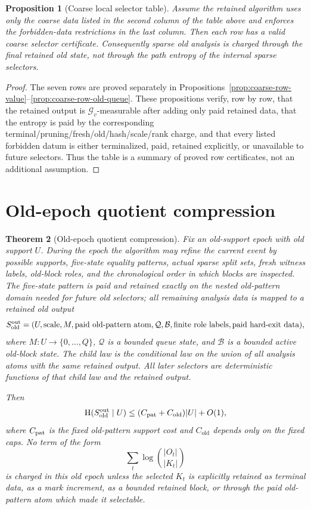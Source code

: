 \documentclass[11pt]{article}
\newtheorem{theorem}{Theorem}[section]
\newtheorem{proposition}[theorem]{Proposition}
\theoremstyle{remark}
\newcommand{\G}{\mathcal G}
\newcommand{\HH}{\mathrm H}
\newcommand{\old}{\mathrm{old}}
\begin{document}
\begin{proposition}[Coarse local selector table]\label{prop:coarse-table}
Assume the retained algorithm uses only the coarse data listed in the second column of the table above and enforces the forbidden-data restrictions in the last column.  Then each row has a valid coarse selector certificate.  Consequently sparse old analysis is charged through the final retained old state, not through the path entropy of the internal sparse selectors.
\end{proposition}

\begin{proof}
The seven rows are proved separately in Propositions~\ref{prop:coarse-row-value}--\ref{prop:coarse-row-old-queue}.  These propositions verify, row by row, that the retained output is $\G_v$-measurable after adding only paid retained data, that the entropy is paid by the corresponding terminal/pruning/fresh/old/hash/scale/rank charge, and that every listed forbidden datum is either terminalized, paid, retained explicitly, or unavailable to future selectors.  Thus the table is a summary of proved row certificates, not an additional assumption.
\end{proof}

\section{Old-epoch quotient compression}

\begin{theorem}[Old-epoch quotient compression]\label{thm:old-epoch-quotient-compression}
Fix an old-support epoch with old support $U$.  During the epoch the algorithm may refine the current event by possible supports, five-state equality patterns, actual sparse split sets, fresh witness labels, old-block roles, and the chronological order in which blocks are inspected.  The five-state pattern is paid and retained exactly on the nested old-pattern domain needed for future old selectors; all remaining analysis data is mapped to a retained old output
\[
        S_{\old}^{\rm out}=(U,\hbox{scale},M,\hbox{paid old-pattern atom},\mathcal Q,\mathcal B,\hbox{finite role labels},\hbox{paid hard-exit data}),
\]
where $M:U\to\{0,\ldots,Q\}$, $\mathcal Q$ is a bounded queue state, and $\mathcal B$ is a bounded active old-block state.  The child law is the conditional law on the union of all analysis atoms with the same retained output.  All later selectors are deterministic functions of that child law and the retained output.

Then
\[
        \HH(S_{\old}^{\rm out}\mid U)\le (C_{\rm pat}+C_{\old})|U|+O(1),
\]
where $C_{\rm pat}$ is the fixed old-pattern support cost and $C_{\old}$ depends only on the fixed caps.  No term of the form
\[
        \sum_t \log\binom{|O_t|}{|K_t|}
\]
is charged in this old epoch unless the selected $K_t$ is explicitly retained as terminal data, as a mark increment, as a bounded retained block, or through the paid old-pattern atom which made it selectable.
\end{theorem}
\end{document}
